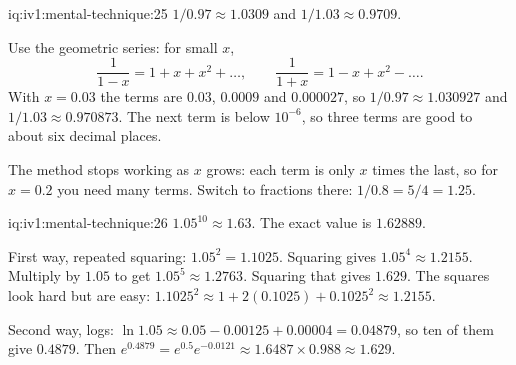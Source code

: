 \begin{solution}{iq:iv1:mental-technique:25}
$1/0.97 \approx 1.0309$ and $1/1.03 \approx 0.9709$.

Use the geometric series: for small $x$,
\[
\frac{1}{1 - x} = 1 + x + x^2 + \dots, \qquad \frac{1}{1 + x} = 1 - x + x^2 - \dots.
\]
With $x = 0.03$ the terms are $0.03$, $0.0009$ and $0.000027$, so $1/0.97 \approx 1.030927$ and $1/1.03 \approx 0.970873$. The next term is below $10^{-6}$, so three terms are good to about six decimal places.

The method stops working as $x$ grows: each term is only $x$ times the last, so for $x = 0.2$ you need many terms. Switch to fractions there: $1/0.8 = 5/4 = 1.25$.

\end{solution}

\begin{solution}{iq:iv1:mental-technique:26}
$1.05^{10} \approx 1.63$. The exact value is $1.62889$.

First way, repeated squaring: $1.05^2 = 1.1025$. Squaring gives $1.05^4 \approx 1.2155$. Multiply by $1.05$ to get $1.05^5 \approx 1.2763$. Squaring that gives $1.629$. The squares look hard but are easy: $1.1025^2 \approx 1 + 2(0.1025) + 0.1025^2 \approx 1.2155$.

Second way, logs: $\ln 1.05 \approx 0.05 - 0.00125 + 0.00004 = 0.04879$, so ten of them give $0.4879$. Then $e^{0.4879} = e^{0.5} e^{-0.0121} \approx 1.6487 \times 0.988 \approx 1.629$.

\end{solution}

